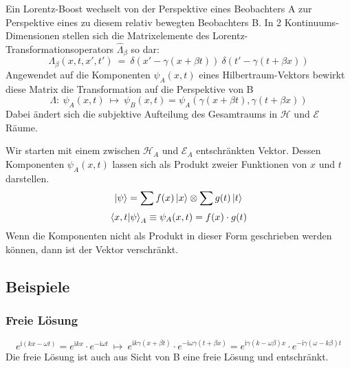 \documentclass[12pt]{article}
\begin{document}
Ein Lorentz-Boost wechselt von der Perspektive eines Beobachters A zur Perspektive eines zu diesem relativ bewegten Beobachters B. In 2 Kontinuums-Dimensionen stellen sich die Matrixelemente des Lorentz-Transformationsoperators $\hat{\Lambda}_\beta$ so dar:
\begin{equation}
\label{eq:matrix_lorentz}
\Lambda_\beta(x,t,x',t')\ =\ \delta(x'-\gamma(x+\beta t))\ \delta(t'-\gamma(t+\beta x))
\end{equation}
Angewendet auf die Komponenten $\psi_A(x,t)$ eines Hilbertraum-Vektors bewirkt diese Matrix die Transformation auf die Perspektive von B
\begin{equation}
\label{eq:lorentz_scalar}
\Lambda:\ \psi_A(x,t)\ \mapsto\ \psi_B(x,t) = \psi_A(\gamma(x+\beta t),\gamma(t+\beta x))
\end{equation}
Dabei ändert sich die subjektive Aufteilung des Gesamtraums in $\mathscr{H}$ und $\mathscr{E}$ Räume.

Wir starten mit einem zwischen $\mathscr{H}_A$ und $\mathscr{E}_A$ entschränkten Vektor. Dessen Komponenten $\psi_A(x,t)$ lassen sich als Produkt zweier Funktionen von $x$ und $t$ darstellen. 
\begin{equation*}
\ket{\psi} = \sum f(x) \ket{x} \otimes  \sum g(t) \ket{t}
\end{equation*}
\begin{equation*}
\bra{x,t}\ket{\psi}_A \equiv \psi_A(x,t) = f(x) \cdot g(t)
\end{equation*}
Wenn die Komponenten nicht als Produkt in dieser Form geschrieben werden können, dann ist der Vektor verschränkt. 

\subsection{Beispiele}

\subsubsection{Freie Lösung}

\begin{equation*}
e^{\mathrm{i}(kx-\omega t)}
= 
e^{\mathrm{i}kx}\cdot e^{-\mathrm{i}\omega t}
\ \mapsto \ 
e^{\mathrm{i}k\gamma(x+\beta t)} \cdot e^{-\mathrm{i}\omega \gamma(t+\beta x)}
= 
e^{\mathrm{i}\gamma(k-\omega \beta)x} \cdot e^{-\mathrm{i}\gamma(\omega- k \beta)t}
\end{equation*}
Die freie Lösung ist auch aus Sicht von B eine freie Lösung und entschränkt. 
\end{document}
